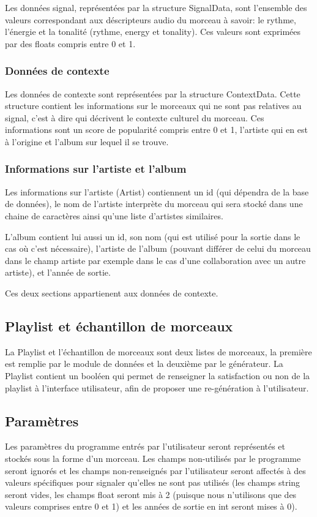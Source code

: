 Les données signal, représentées par la structure SignalData, sont l'ensemble 
des valeurs correspondant aux déscripteurs audio du morceau à savoir: le rythme, 
l'énergie et la tonalité (rythme, energy et tonality). Ces valeurs sont 
exprimées par des floats compris entre 0 et 1.

\subsubsection{Données de contexte}

Les données de contexte sont représentées par la structure ContextData. Cette 
structure contient les informations sur le morceaux qui ne sont pas relatives 
au signal, c'est à dire qui décrivent le contexte culturel du morceau. Ces 
informations sont un score de popularité compris entre 0 et 1, l'artiste qui 
en est à l'origine et l'album sur lequel il se trouve.

\subsubsection{Informations sur l'artiste et l'album}

Les informations sur l'artiste (Artist) contiennent un id (qui dépendra de la 
base de données), le nom de l'artiste interprète du morceau qui sera stocké dans 
une chaine de caractères ainsi qu'une liste d'artistes similaires.

L'album contient lui aussi un id, son nom (qui est utilisé pour la sortie dans 
le cas où c'est nécessaire), l'artiste de l'album (pouvant différer de celui du 
morceau dans le champ artiste par exemple dans le cas d'une collaboration avec 
un autre artiste), et l'année de sortie.

Ces deux sections appartienent aux données de contexte.

\subsection{Playlist et échantillon de morceaux}

La Playlist et l'échantillon de morceaux sont deux listes de morceaux, la 
première est remplie par le module de données et la deuxième par le générateur. 
La Playlist contient un booléen qui permet de renseigner la satisfaction ou non 
de la playlist à l'interface utilisateur, afin de proposer une re-génération à 
l'utilisateur.

\subsection{Paramètres}

Les paramètres du programme entrés par l'utilisateur seront représentés et 
stockés sous la forme d'un morceau. Les champs non-utilisés par le programme 
seront ignorés et les champs non-renseignés par l'utilisateur seront affectés 
à des valeurs spécifiques pour signaler qu'elles ne sont pas utilisés (les 
champs string seront vides, les champs float seront mis à 2 (puisque nous 
n'utilisons que des valeurs comprises entre 0 et 1) et les années de sortie 
en int seront mises à 0).